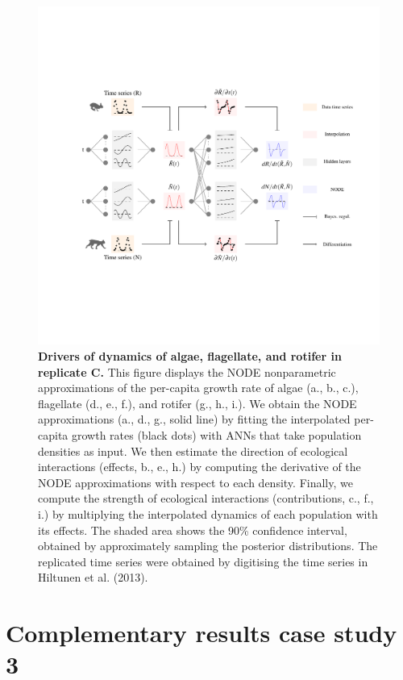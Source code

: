 \documentclass[11pt, oneside]{article}
\begin{document}
\newpage
\begin{figure}[H]
\includegraphics[width=1\linewidth,page=22]{figures/main.pdf}
\caption{
    \textbf{Drivers of dynamics of algae, flagellate, and rotifer in replicate C.}
    This figure displays the NODE nonparametric approximations of the per-capita growth rate of algae (a., b., c.), flagellate (d., e., f.), and rotifer (g., h., i.).
    We obtain the NODE approximations (a., d., g., solid line) by fitting the interpolated per-capita growth rates (black dots) with ANNs that take population densities as input.
    We then estimate the direction of ecological interactions (effects, b., e., h.) by computing the derivative of the NODE approximations with respect to each density.
    Finally, we compute the strength of ecological interactions (contributions, c., f., i.) by multiplying the interpolated dynamics of each population with its effects.
    The shaded area shows the 90\% confidence interval, obtained by approximately sampling the posterior distributions. 
    The replicated time series were obtained by digitising the time series in Hiltunen et al. (2013).
}
\end{figure}
\newpage

\newpage
\section{Complementary results case study 3}
\end{document}

